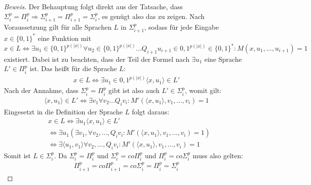 \begin{proof}[Beweis]
    Der Behauptung folgt direkt aus der Tatsache, dass $\Sigma^p_i = \Pi^p_i \Rightarrow \Sigma^p_{i+1} = \Pi^p_{i+1} = \Sigma^p_i$, es genügt also das zu zeigen.
    Nach Voraussetzung gilt für alle Sprachen $L$ in $\Sigma^p_{i+1}$, sodass für jede Eingabe $x \in \{0,1\}^*$ eine Funktion mit 
    $$
    x \in L \Leftrightarrow \exists u_1 \in \{0,1\}^{p(|x|)} \forall u_2 \in \{0,1\}^{p(|x|)} ... Q_{i+1}u_{i + 1} \in {0,1}^{p(|x|)} \in \{0,1\}^* : M(x, u_1, ..., u_{i+1}) = 1
    $$
    existiert.
    Dabei ist zu beachten, dass der Teil der Formel nach $\exists u_1$ eine Sprache $L' \in \Pi^p_i$ ist.
    Das heißt für die Sprache $L$:
    \begin{align*}
    x \in L \Leftrightarrow \exists u_1 \in {0,1}^{p(|x|)} \langle x, u_1 \rangle \in L'
    \end{align*}
    Nach der Annahme, dass  $\Sigma^p_i = \Pi^p_i$ gibt ist also auch $L' \in \Sigma^p_i$, womit gilt:
    \begin{align*}
    \langle x, u_1 \rangle \in L' \Leftrightarrow \exists v_1 \forall v_2 ... Q_i v_i : M'(\langle x, u_1 \rangle, v_1, ..., v_i) = 1 
    \end{align*}
    Eingesetzt in die Definition der Sprache $L$ folgt daraus:
    \begin{align*}
    & x \in L \Leftrightarrow \exists u_1 \langle x, u_1 \rangle \in L' \\
    & \Leftrightarrow \exists u_1 (\exists v_1, \forall v_2, ..., Q_i v_i :  M'(\langle x, u_1 \rangle, v_1, ..., v_i) = 1) \\
    & \Leftrightarrow \exists \langle u_1, v_1 \rangle \forall v_2, ..., Q_i v_i : M'(\langle x, u_1 \rangle, v_1, ..., v_i) = 1
    \end{align*}
    Somit ist $L \in \Sigma^p_i$. Da $\Sigma^p_i = \Pi^p_i$ und $\Sigma^p_i = co\Pi^p_i$ und $\Pi^p_i = co\Sigma^p_i$ muss also gelten:
    \begin{align*}
    \Pi^p_{i+1} = co\Pi^p_{i+1} = co\Sigma^p_i = \Pi^p_i = \Sigma^p_i
    \end{align*}
\end{proof}